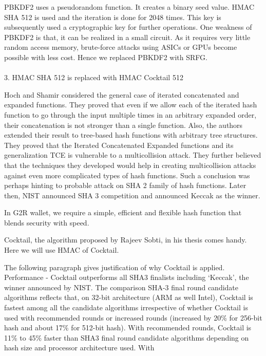 \documentclass[12pt]{article}
\begin{document}
\par PBKDF2 uses a pseudorandom function. It
creates a binary seed value. HMAC SHA 512 is
used and the iteration is done for 2048 times.
This key is subsequently used a cryptographic
key for further operations. One weakness of
PBKDF2 is that, it can be realized in a small
circuit. As it requires very little random access
memory, brute-force attacks using ASICs or
GPUs become possible with less cost. Hence we
replaced PBKDF2 with SRFG. 
\\
\\
3. HMAC SHA 512 is replaced with HMAC
Cocktail 512
\par

 Hoch and Shamir considered the general
case of iterated concatenated and expanded
functions. They proved that even if we allow
each of the iterated hash function to go through
the input multiple times in an arbitrary expanded
order, their concatenation is not stronger than a
single function. Also, the authors extended their
result to tree-based hash functions with arbitrary
tree structures. They proved that the Iterated
Concatenated Expanded functions and its
generalization TCE is vulnerable to a
multicollision attack. They further believed that
the techniques they developed would help in
creating multicollision attacks against even more
complicated types of hash functions. Such a
conclusion was perhaps hinting to probable
attack on SHA 2 family of hash functions. Later
then, NIST announced SHA 3 competition and
announced Keccak as the winner.\par
 In G2R wallet, we require a simple, efficient
and flexible hash function that blends security
with speed.\par
 Cocktail, the algorithm proposed by Rajeev
Sobti,  in his thesis comes handy. Here we
will use HMAC of Cocktail.
 \par The following paragraph gives justification of
why Cocktail is applied.
\\
 Performance - Cocktail outperforms all SHA3
finalists including ‘Keccak’, the winner
announced by NIST. The comparison SHA-3
final round candidate algorithms reflects that, on
32-bit architecture (ARM as well Intel), Cocktail
is fastest among all the candidate algorithms
irrespective of whether Cocktail is used with
recommended rounds or increased rounds
(increased by 20\% for 256-bit hash and about
17\% for 512-bit hash). With recommended
rounds, Cocktail is 11\% to 45\% faster than SHA3 final round candidate algorithms depending on
hash size and processor architecture used. With
\end{document}
